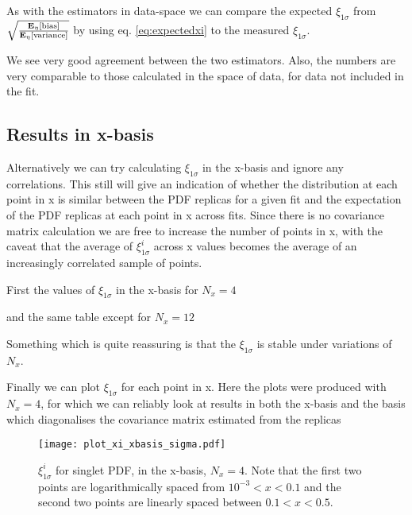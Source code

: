 As with the estimators in data-space we can compare the expected $\xi_{1\sigma}$
from $\sqrt{\frac{\mathbf{E}_{\eta}\left[ {\rm bias} \right]}{\mathbf{E}_{\eta}\left[ {\rm variance} \right]}}$ by using eq. \eqref{eq:expectedxi}
to the measured $\xi_{1\sigma}$.



We see very good agreement between the two estimators. Also, the numbers
are very comparable to those calculated in the space of data, for data not
included in the fit.

\subsection{Results in x-basis}

Alternatively we can try calculating $\xi_{1\sigma}$ in the x-basis and ignore
any correlations. This still will give an indication of whether the distribution
at each point in x is similar between the PDF replicas for a given fit and the 
expectation of the PDF replicas at each point in x across fits. Since there
is no covariance matrix calculation we are free to increase the number of points
in x, with the caveat that the average of $\xi_{1\sigma}^i$ across x values
becomes the average of an increasingly correlated sample of points.

First the values of $\xi_{1\sigma}$ in the x-basis for $N_x=4$



and the same table except for $N_x=12$



Something
which is quite reassuring is that the $\xi_{1\sigma}$ is stable under variations
of $N_x$.

Finally we can plot $\xi_{1\sigma}$ for each point in x. Here the plots were
produced with $N_x=4$, for which we can reliably look at results in both the
x-basis and the basis which diagonalises the covariance matrix estimated
from the replicas

\begin{figure}
    \centering
    \texttt{[image: plot\_xi\_xbasis\_sigma.pdf]}
    \caption{
        $\xi^{i}_{1\sigma}$ for singlet PDF, in the x-basis, $N_x=4$. Note that
        the first two points are logarithmically spaced from $10^{-3} < x < 0.1$
        and the second two points are linearly spaced between $0.1 < x < 0.5$.}
    \label{fig:pdfxisinglet}
\end{figure}

